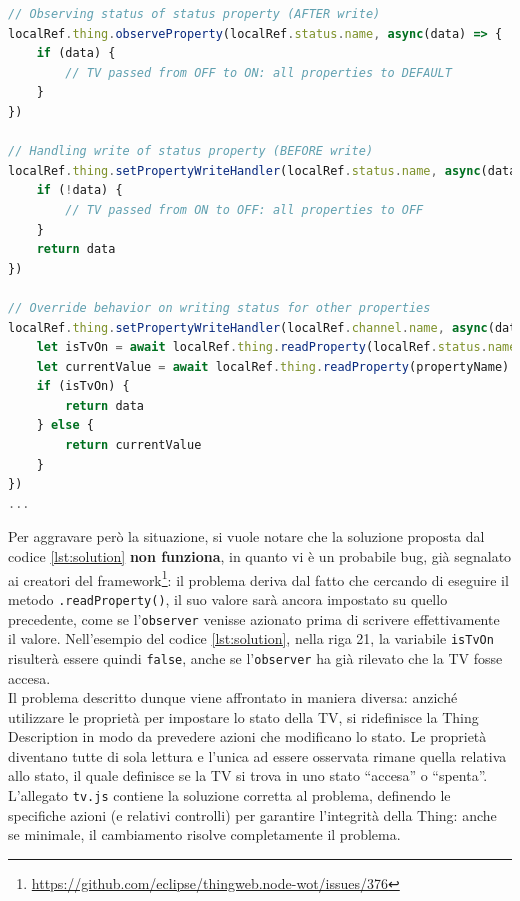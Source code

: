 \documentclass[12pt,a4paper,openright,oneside]{report}
\newcommand{\quotes}[1]{``#1''}
\begin{document}
\begin{lstlisting}[language=JavaScript,caption={Solzuione proposta per la dipendenza tra proprietà della Thing},label=lst:solution]
// Observing status of status property (AFTER write)
localRef.thing.observeProperty(localRef.status.name, async(data) => {
	if (data) {
		// TV passed from OFF to ON: all properties to DEFAULT
	}
})

// Handling write of status property (BEFORE write)
localRef.thing.setPropertyWriteHandler(localRef.status.name, async(data) => {
	if (!data) {
		// TV passed from ON to OFF: all properties to OFF
	}
	return data
})

// Override behavior on writing status for other properties
localRef.thing.setPropertyWriteHandler(localRef.channel.name, async(data) => {
	let isTvOn = await localRef.thing.readProperty(localRef.status.name)
	let currentValue = await localRef.thing.readProperty(propertyName)
	if (isTvOn) {
		return data
	} else {
		return currentValue
	}
})
...
\end{lstlisting}

Per aggravare però la situazione, si vuole notare che la soluzione proposta dal codice \ref{lst:solution} \textbf{non funziona}, in quanto vi è un probabile bug, già segnalato ai creatori del framework\footnote{\url{https://github.com/eclipse/thingweb.node-wot/issues/376}}: il problema deriva dal fatto che cercando di eseguire il metodo \texttt{.readProperty()}, il suo valore sarà ancora impostato su quello precedente, come se l'\texttt{observer} venisse azionato prima di scrivere effettivamente il valore. Nell'esempio del codice \ref{lst:solution}, nella riga 21, la variabile \texttt{isTvOn} risulterà essere quindi \texttt{false}, anche se l'\texttt{observer} ha già rilevato che la TV fosse accesa.\\

Il problema descritto dunque viene affrontato in maniera diversa: anziché utilizzare le proprietà per impostare lo stato della TV, si ridefinisce la Thing Description in modo da prevedere azioni che modificano lo stato. Le proprietà diventano tutte di sola lettura e l'unica ad essere osservata rimane quella relativa allo stato, il quale definisce se la TV si trova in uno stato \quotes{accesa} o \quotes{spenta}. L'allegato \texttt{tv.js} contiene la soluzione corretta al problema, definendo le specifiche azioni (e relativi controlli) per garantire l'integrità della Thing: anche se minimale, il cambiamento risolve completamente il problema.
\end{document}
